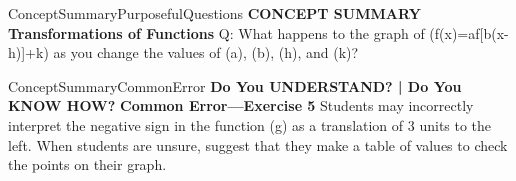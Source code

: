 \documentclass{article}
\newenvironment{te-addendum}[2]{}{}     %
\newcommand{\answer}[1]{}               %
\begin{document}
\begin{te-addendum}{ConceptSummary}{PurposefulQuestions}
\textbf{CONCEPT SUMMARY Transformations of Functions}
Q: What happens to the graph of (f(x)=a\cdot f[b(x-h)]+k) as you change the values of (a), (b), (h), and (k)?
\answer{Changing (a) results in a vertical stretch or compression. Changing (b) results in a horizontal stretch or compression. Changing (h) results in a horizontal translation. Changing (k) results in a vertical translation.}
\end{te-addendum}
\begin{te-addendum}{ConceptSummary}{CommonError}
\textbf{Do You UNDERSTAND? | Do You KNOW HOW?}
\textbf{Common Error—Exercise 5} Students may incorrectly interpret the negative sign in the function (g) as a translation of 3 units to the left. When students are unsure, suggest that they make a table of values to check the points on their graph.
\end{te-addendum}
\end{document}
